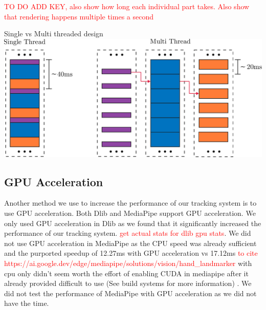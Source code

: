 \textcolor{red}{TO DO ADD KEY, also show how long each individual part takes. Also show that rendering happens multiple times a second}
\begin{figureBox}[label={fig:single-vs-multi}, width=0.8\linewidth]{Single vs Multi threaded design}
    \includegraphics[width = 0.8\linewidth]{./implementation/figures/single-vs-multi.pdf}
\end{figureBox}


\subsection{GPU Acceleration}

Another method we use to increase the performance of our tracking system is to use GPU acceleration. Both Dlib and MediaPipe support GPU acceleration. We only used GPU acceleration in Dlib as we found that it significantly increased the performance of our tracking system. \textcolor{red}{get actual stats for dlib gpu stats}. We did not use GPU acceleration in MediaPipe as the CPU speed was already sufficient and the purported speedup of 12.27ms with GPU acceleration vs 17.12ms \textcolor{red}{to cite https://ai.google.dev/edge/mediapipe/solutions/vision/hand\_landmarker} with cpu only didn't seem worth the effort of enabling CUDA in mediapipe after it already provided difficult to use (See build systems for more information) . We did not test the performance of MediaPipe with GPU acceleration as we did not have the time.  \\

